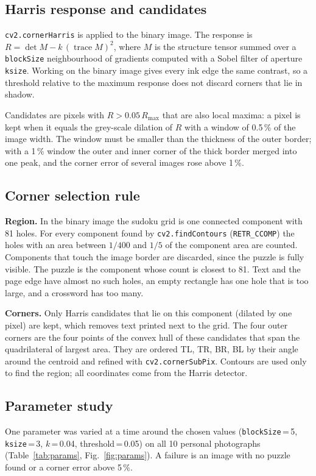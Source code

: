 \documentclass[conference]{IEEEtran}
\begin{document}
\subsection{Harris response and candidates}
\texttt{cv2.cornerHarris} is applied to the binary image. The response is
$R=\det M-k\,(\operatorname{trace}M)^2$, where $M$ is the structure tensor
summed over a \texttt{blockSize} neighbourhood of gradients computed with a
Sobel filter of aperture \texttt{ksize}. Working on the binary image gives
every ink edge the same contrast, so a threshold relative to the maximum
response does not discard corners that lie in shadow.

Candidates are pixels with $R > 0.05\,R_{\max}$ that are also local maxima:
a pixel is kept when it equals the grey-scale dilation of $R$ with a window
of 0.5\,\% of the image width. The window must be smaller than the thickness
of the outer border; with a 1\,\% window the outer and inner corner of the
thick border merged into one peak, and the corner error of several images
rose above 1\,\%.

\subsection{Corner selection rule}
\textbf{Region.} In the binary image the sudoku grid is one connected
component with 81 holes. For every component found by
\texttt{cv2.findContours} (\texttt{RETR\_CCOMP}) the holes with an area
between $1/400$ and $1/5$ of the component area are counted. Components that
touch the image border are discarded, since the puzzle is fully visible. The
puzzle is the component whose count is closest to 81. Text and the page edge
have almost no such holes, an empty rectangle has one hole that is too
large, and a crossword has too many.

\textbf{Corners.} Only Harris candidates that lie on this component
(dilated by one pixel) are kept, which removes text printed next to the
grid. The four outer corners are the four points of the convex hull of these
candidates that span the quadrilateral of largest area. They are ordered
TL, TR, BR, BL by their angle around the centroid and refined with
\texttt{cv2.cornerSubPix}. Contours are used only to find the region; all
coordinates come from the Harris detector.

\subsection{Parameter study}
One parameter was varied at a time around the chosen values
(\texttt{blockSize}\,=\,5, \texttt{ksize}\,=\,3, $k$\,=\,0.04,
threshold\,=\,0.05) on all 10 personal photographs
(Table~\ref{tab:params}, Fig.~\ref{fig:params}). A failure is an image
with no puzzle found or a corner error above 5\,\%.
\end{document}
